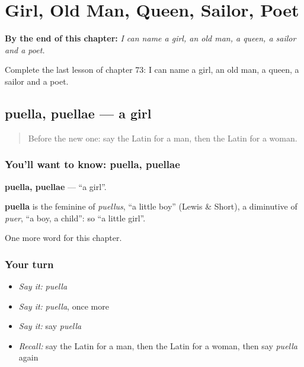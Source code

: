 
\chapter{Girl, Old Man, Queen, Sailor, Poet}
\label{ch:la-girl-old-man-queen-sailor-poet}

\begin{chapteropening}
\textbf{By the end of this chapter:} \emph{I can name a girl, an old man, a queen, a sailor and a poet.}

Complete the last lesson of chapter 73: I can name a girl, an old man, a queen, a sailor and a poet.
\end{chapteropening}

\section[puella, puellae]{puella, puellae — a girl}

\label{lesson:LA-C73-puella}



\begin{quote}
Before the new one: say the Latin for a man, then the Latin for a woman.
\end{quote}

\subsection*{You'll want to know: puella, puellae}
\textbf{puella, puellae} — \textquotedblleft{}a girl\textquotedblright{}.

\begin{cousinweb}
\textbf{puella} is the feminine of \emph{puellus}, \textquotedblleft{}a little boy\textquotedblright{} (Lewis \& Short), a diminutive of \emph{puer}, \textquotedblleft{}a boy, a child\textquotedblright{}: so \textquotedblleft{}a little girl\textquotedblright{}.
\end{cousinweb}

\begin{grammarlens}[title={What you've built}]
One more word for this chapter.
\end{grammarlens}

\subsection*{Your turn}
\begin{itemize}
\raggedright
  \item \emph{Say it:} \emph{puella}
  \item \emph{Say it:} \emph{puella}, once more
  \item \emph{Say it:} say \emph{puella}
  \item \emph{Recall:} say the Latin for a man, then the Latin for a woman, then say \emph{puella} again
\end{itemize}

